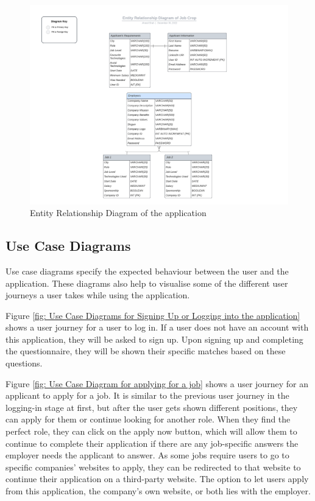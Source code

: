 \begin{figure}
    \noindent
    \centering
    \includegraphics[width = 140mm]{Figures/ERD.pdf}
    \decoRule
    \caption[Entity Relationship Diagram]{Entity Relationship Diagram of the application}
    \label{fig: Entity Relationship Diagram}
\end{figure}

\subsection{Use Case Diagrams}
Use case diagrams specify the expected behaviour between the user and the application. These diagrams also help to visualise some of the different user journeys a user takes while using the application. 

Figure \ref{fig: Use Case Diagrams for Signing Up or Logging into the application} shows a user journey for a user to log in. If a user does not have an account with this application, they will be asked to sign up. Upon signing up and completing the questionnaire, they will be shown their specific matches based on these questions.

Figure \ref{fig: Use Case Diagram for applying for a job} shows a user journey for an applicant to apply for a job. It is similar to the previous user journey in the logging-in stage at first, but after the user gets shown different positions, they can apply for them or continue looking for another role. When they find the perfect role, they can click on the apply now button, which will allow them to continue to complete their application if there are any job-specific answers the employer needs the applicant to answer. As some jobs require users to go to specific companies' websites to apply, they can be redirected to that website to continue their application on a third-party website. The option to let users apply from this application, the company's own website, or both lies with the employer.

